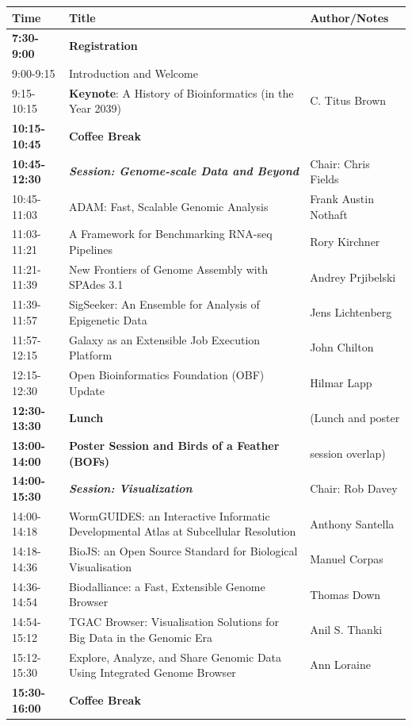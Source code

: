 \documentclass[10pt,oneside]{article}
\begin{document}
\begin{center}
\begin{tabular}{|p{2.0cm}|p{10cm}|p{3.3cm}|}
\hline
Time & Title & Author/Notes \\
\hline
\textbf{7:30-9:00} & \textbf{Registration} &\\
\hline
9:00-9:15 & Introduction and Welcome &\\
9:15-10:15 & \textbf{Keynote}: A History of Bioinformatics (in the Year 2039) & C. Titus Brown\\
\hline
\textbf{10:15-10:45} & \textbf{Coffee Break} &\\
\hline
\textbf{10:45-12:30} & \textbf{\textit{Session: Genome-scale Data and Beyond}} & Chair: Chris Fields\\
10:45-11:03 & ADAM: Fast, Scalable Genomic Analysis & Frank Austin Nothaft\\
11:03-11:21 & A Framework for Benchmarking RNA-seq Pipelines & Rory Kirchner\\
11:21-11:39 & New Frontiers of Genome Assembly with SPAdes 3.1 & Andrey Prjibelski\\
11:39-11:57 & SigSeeker: An Ensemble for Analysis of Epigenetic Data & Jens Lichtenberg\\
11:57-12:15 & Galaxy as an Extensible Job Execution Platform & John Chilton\\
\hline
12:15-12:30 & Open Bioinformatics Foundation (OBF) Update & Hilmar Lapp\\
\hline
\textbf{12:30-13:30} & \textbf{Lunch} & (Lunch and poster\\
\textbf{13:00-14:00} & \textbf{Poster Session and Birds of a Feather (BOFs)} & session overlap)\\
\hline
\textbf{14:00-15:30} & \textbf{\textit{Session: Visualization}} & Chair: Rob Davey\\
14:00-14:18 & WormGUIDES: an Interactive Informatic Developmental Atlas at Subcellular Resolution & Anthony Santella\\
14:18-14:36 & BioJS: an Open Source Standard for Biological Visualisation & Manuel Corpas\\
14:36-14:54 & Biodalliance: a Fast, Extensible Genome Browser & Thomas Down\\
14:54-15:12 & TGAC Browser: Visualisation Solutions for Big Data in the Genomic Era & Anil S. Thanki\\
15:12-15:30 & Explore, Analyze, and Share Genomic Data Using Integrated Genome Browser & Ann Loraine\\
\hline
\textbf{15:30-16:00} & \textbf{Coffee Break} &\\

\end{tabular}
\end{center}
\end{document}
